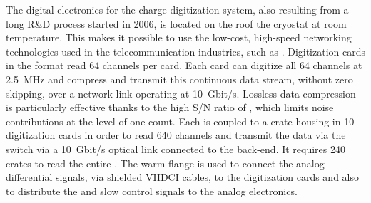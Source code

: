 
The digital electronics for the charge digitization system, also resulting from a long R\&D process started in 2006, is located %
on the roof the cryostat at room temperature. This makes it possible to use the low-cost, high-speed  networking technologies used in the telecommunication industries, such as . 
Digitization cards in the  format read \num{64} channels per card. Each  card can digitize all  \num{64} channels at \SI{2.5}{MHz} and compress and transmit this continuous data stream, without zero skipping, over a network link operating at \SI{10}{Gbit/s}. Lossless data compression is particularly effective thanks to the high S/N ratio
 of \dual{}, which limits noise contributions at the level of one  count. Each  is coupled to a  crate housing in \num{10}  digitization cards in order to read  \num{640} channels and transmit the data via the  switch via a \SI{10}{Gbit/s} optical link connected to the  back-end. It requires \num{240}  crates to read the entire . The  warm flange is used to connect the analog differential signals, via shielded VHDCI cables, to the  digitization cards and also to distribute the  and slow control signals to the analog  electronics.  

